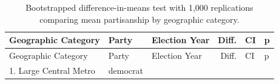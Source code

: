 \documentclass[10pt,]{article}
\begin{document}
\begin{longtable}[]{@{}lllrll@{}}
\caption{Bootstrapped difference-in-means test with 1,000 replications
comparing mean partisanship by geographic category.}\tabularnewline
\toprule
\begin{minipage}[b]{0.22\columnwidth}\raggedright
Geographic Category\strut
\end{minipage} & \begin{minipage}[b]{0.10\columnwidth}\raggedright
Party\strut
\end{minipage} & \begin{minipage}[b]{0.21\columnwidth}\raggedright
Election Year\strut
\end{minipage} & \begin{minipage}[b]{0.09\columnwidth}\raggedleft
Diff.\strut
\end{minipage} & \begin{minipage}[b]{0.16\columnwidth}\raggedright
CI\strut
\end{minipage} & \begin{minipage}[b]{0.06\columnwidth}\raggedright
p\strut
\end{minipage}\tabularnewline
\midrule
\endfirsthead
\toprule
\begin{minipage}[b]{0.22\columnwidth}\raggedright
Geographic Category\strut
\end{minipage} & \begin{minipage}[b]{0.10\columnwidth}\raggedright
Party\strut
\end{minipage} & \begin{minipage}[b]{0.21\columnwidth}\raggedright
Election Year\strut
\end{minipage} & \begin{minipage}[b]{0.09\columnwidth}\raggedleft
Diff.\strut
\end{minipage} & \begin{minipage}[b]{0.16\columnwidth}\raggedright
CI\strut
\end{minipage} & \begin{minipage}[b]{0.06\columnwidth}\raggedright
p\strut
\end{minipage}\tabularnewline
\midrule
\endhead
\begin{minipage}[t]{0.22\columnwidth}\raggedright
1. Large Central Metro\strut
\end{minipage} & \begin{minipage}[t]{0.10\columnwidth}\raggedright
democrat\strut
\end{minipage} & \begin{minipage}[t]{0.21\columnwidth}\raggedright

\end{minipage}
\end{longtable}
\end{document}
